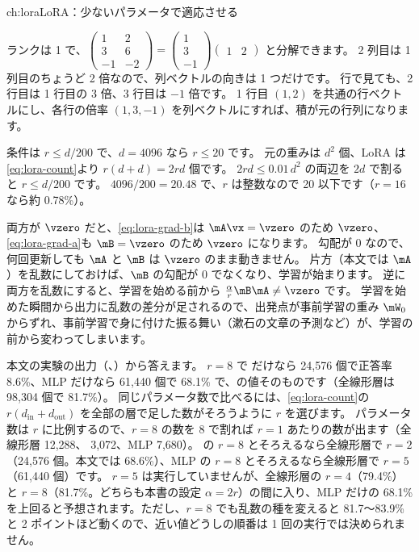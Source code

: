 \begin{answers}{ch:lora}{LoRA：少ないパラメータで適応させる}
\item ランクは 1 で、$\begin{pmatrix}1&2\\3&6\\-1&-2\end{pmatrix}=\begin{pmatrix}1\\3\\-1\end{pmatrix}\begin{pmatrix}1&2\end{pmatrix}$ と分解できます。
2 列目は 1 列目のちょうど 2 倍なので、列ベクトルの向きは 1 つだけです。
行で見ても、2 行目は 1 行目の 3 倍、3 行目は $-1$ 倍です。
1 行目 $(1,2)$ を共通の行ベクトルにし、各行の倍率 $(1,3,-1)$ を列ベクトルにすれば、積が元の行列になります。
\item 条件は $r\le d/200$ で、$d=4096$ なら $r\le20$ です。
元の重みは $d^2$ 個、LoRA は\eqref{eq:lora-count}より $r(d+d)=2rd$ 個です。
$2rd\le0.01\,d^2$ の両辺を $2d$ で割ると $r\le d/200$ です。
$4096/200=20.48$ で、$r$ は整数なので 20 以下です（$r=16$ なら約 0.78\%）。
\item 両方が $\vzero$ だと、\eqref{eq:lora-grad-b}は $\mA\vx=\vzero$ のため $\vzero$、\eqref{eq:lora-grad-a}も $\mB=\vzero$ のため $\vzero$ になります。
勾配が 0 なので、何回更新しても $\mA$ と $\mB$ は $\vzero$ のまま動きません。
片方（本文では $\mA$）を乱数にしておけば、$\mB$ の勾配が 0 でなくなり、学習が始まります。
逆に両方を乱数にすると、学習を始める前から $\frac{\alpha}{r}\mB\mA\ne\vzero$ です。
学習を始めた瞬間から出力に乱数の差分が足されるので、出発点が事前学習の重み $\mW_0$ からずれ、事前学習で身に付けた振る舞い（漱石の文章の予測など）が、学習の前から変わってしまいます。
\item 本文の実験の出力（、）から答えます。
$r=8$ で  だけなら 24,576 個で正答率 8.6\%、MLP だけなら 61,440 個で 68.1\% で、の値そのものです（全線形層は 98,304 個で 81.7\%）。
同じパラメータ数で比べるには、\eqref{eq:lora-count}の $r(d_{\text{in}}+d_{\text{out}})$ を全部の層で足した数がそろうように $r$ を選びます。
パラメータ数は $r$ に比例するので、$r=8$ の数を 8 で割れば $r=1$ あたりの数が出ます（全線形層 12,288、 3,072、MLP 7,680）。
 の $r=8$ とそろえるなら全線形層で $r=2$（24,576 個。本文では 68.6\%）、MLP の $r=8$ とそろえるなら全線形層で $r=5$（61,440 個）です。
$r=5$ は実行していませんが、全線形層の $r=4$（79.4\%）と $r=8$（81.7\%。どちらも本書の設定 $\alpha=2r$）の間に入り、MLP だけの 68.1\% を上回ると予想されます。ただし、$r=8$ でも乱数の種を変えると 81.7〜83.9\% と 2 ポイントほど動くので、近い値どうしの順番は 1 回の実行では決められません。

\end{answers}
